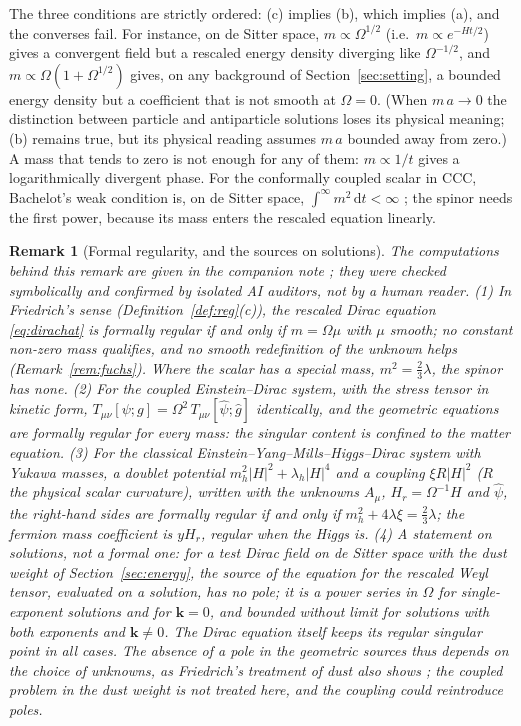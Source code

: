 \documentclass[11pt,a4paper]{article}
\newtheorem{remark}{Remark}
\theoremstyle{definition}
\newcommand{\dd}{\mathrm{d}}
\newcommand{\hg}{\hat g}
\newcommand{\hpsi}{\hat\psi}
\begin{document}
The three conditions are strictly ordered: (c) implies (b), which implies (a), and the converses fail. For instance, on de Sitter space, $m\propto\Omega^{1/2}$ (i.e.\ $m\propto e^{-Ht/2}$) gives a convergent field but a rescaled energy density diverging like $\Omega^{-1/2}$, and $m\propto\Omega(1+\Omega^{1/2})$ gives, on any background of Section~\ref{sec:setting}, a bounded energy density but a coefficient that is not smooth at $\Omega=0$. (When $m\,a\to0$ the distinction between particle and antiparticle solutions loses its physical meaning; (b) remains true, but its physical reading assumes $m\,a$ bounded away from zero.) A mass that tends to zero is not enough for any of them: $m\propto1/t$ gives a logarithmically divergent phase. For the conformally coupled scalar in CCC, Bachelot's weak condition is, on de Sitter space, $\int^{\infty}m^{2}\,\dd t<\infty$ \cite{Bachelot2020}; the spinor needs the first power, because its mass enters the rescaled equation linearly.

\begin{remark}[Formal regularity, and the sources on solutions]
\label{rem:friedrich}
The computations behind this remark are given in the companion note \cite{Companion}; they were checked symbolically and confirmed by isolated AI auditors, not by a human reader. (1) In Friedrich's sense (Definition~\ref{def:reg}(c)), the rescaled Dirac equation \eqref{eq:dirachat} is formally regular if and only if $m=\Omega\mu$ with $\mu$ smooth; no constant non-zero mass qualifies, and no smooth redefinition of the unknown helps (Remark~\ref{rem:fuchs}). Where the scalar has a special mass, $m^{2}=\tfrac23\lambda$, the spinor has none. (2) For the coupled Einstein--Dirac system, with the stress tensor in kinetic form, $T_{\mu\nu}[\psi;g]=\Omega^{2}\,T_{\mu\nu}[\hpsi;\hg]$ identically, and the geometric equations are formally regular for every mass: the singular content is confined to the matter equation. (3) For the classical Einstein--Yang--Mills--Higgs--Dirac system with Yukawa masses, a doublet potential $m_{h}^{2}|H|^{2}+\lambda_{h}|H|^{4}$ and a coupling $\xi R|H|^{2}$ ($R$ the physical scalar curvature), written with the unknowns $A_{\mu}$, $H_{r}=\Omega^{-1}H$ and $\hpsi$, the right-hand sides are formally regular if and only if $m_{h}^{2}+4\lambda\xi=\tfrac23\lambda$; the fermion mass coefficient is $y H_{r}$, regular when the Higgs is. (4) A statement on solutions, not a formal one: for a test Dirac field on de Sitter space with the dust weight of Section~\ref{sec:energy}, the source of the equation for the rescaled Weyl tensor, evaluated on a solution, has no pole; it is a power series in $\Omega$ for single-exponent solutions and for $\mathbf{k}=0$, and bounded without limit for solutions with both exponents and $\mathbf{k}\neq0$. The Dirac equation itself keeps its regular singular point in all cases. The absence of a pole in the geometric sources thus depends on the choice of unknowns, as Friedrich's treatment of dust also shows \cite{Friedrich2017}; the coupled problem in the dust weight is not treated here, and the coupling could reintroduce poles.
\end{remark}
\end{document}
